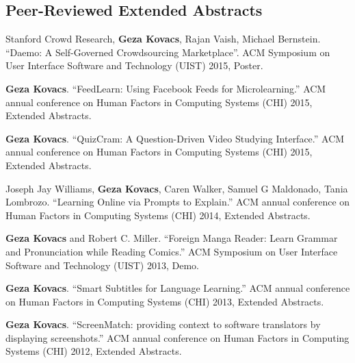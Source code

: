 \documentclass[margin,line]{resume}
\begin{document}
\begin{resume}

\section{\mysidestyle Peer-Reviewed Extended Abstracts}

Stanford Crowd Research, \textbf{Geza Kovacs}, Rajan Vaish, Michael Bernstein. ``Daemo: A Self-Governed Crowdsourcing Marketplace''. ACM Symposium on User Interface Software and Technology (UIST) 2015, Poster.

\textbf{Geza Kovacs}. ``FeedLearn: Using Facebook Feeds for Microlearning.'' ACM annual conference on Human Factors in Computing Systems (CHI) 2015, Extended Abstracts. %

\textbf{Geza Kovacs}. ``QuizCram: A Question-Driven Video Studying Interface.'' ACM annual conference on Human Factors in Computing Systems (CHI) 2015, Extended Abstracts.

Joseph Jay Williams, \textbf{Geza Kovacs}, Caren Walker, Samuel G Maldonado, Tania Lombrozo. ``Learning Online via Prompts to Explain.'' ACM annual conference on Human Factors in Computing Systems (CHI) 2014, Extended Abstracts.

\textbf{Geza Kovacs} and Robert C. Miller. ``Foreign Manga Reader: Learn Grammar and Pronunciation while Reading Comics.'' ACM Symposium on User Interface Software and Technology (UIST) 2013, Demo.

\textbf{Geza Kovacs}. ``Smart Subtitles for Language Learning.'' ACM annual conference on Human Factors in Computing Systems (CHI) 2013, Extended Abstracts.%

\textbf{Geza Kovacs}. ``ScreenMatch: providing context to software translators by displaying screenshots.'' ACM annual conference on Human Factors in Computing Systems (CHI) 2012, Extended Abstracts.%


\end{resume}
\end{document}

